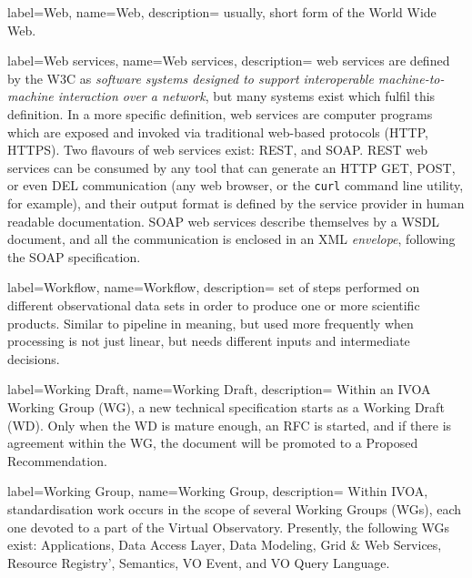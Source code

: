 {
    label={Web},
    name={Web},
    description={
    	usually, short form of the \gls{World Wide Web}.
    }
}

{
    label={Web services},
    name={Web services},
    description={
    	web services are defined by the \gls{W3C} as \emph{software
        systems designed to support interoperable machine-to-machine
        interaction over a network}, but many systems exist which
        fulfil this definition. In a more specific definition, web
        services are computer programs which are exposed and invoked
        via traditional web-based protocols (\gls{HTTP}, \gls{HTTPS}).
        Two flavours of web services exist: \gls{REST}, and \gls{SOAP}.
        REST web services can be consumed by any tool that can generate
        an HTTP GET, POST, or even DEL communication (any web browser,
        or the \texttt{curl} command line utility,
		for example), and their output
        format is defined by the service provider in human readable
        documentation. SOAP web services describe themselves by a
        \gls{WSDL} document, and all the communication is enclosed in
        an \gls{XML} \emph{envelope}, following the SOAP specification.
    }
}

{
    label={Workflow},
    name={Workflow},
    description={
    	set of steps performed on different observational data sets in
        order to produce one or more scientific products. Similar to
        pipeline in meaning, but used more frequently when processing
        is not just linear, but needs different inputs and intermediate
        decisions.
    }
}

{
    label={Working Draft},
    name={Working Draft},
    description={
    	Within an \gls{IVOA} \gls{Working Group} (WG), a new technical
        specification starts as a \gls{Working Draft} (WD). Only when
        the WD is mature enough, an \gls{RFC} is started, and if there
        is agreement within the WG, the document will be promoted to a
        \gls{Proposed Recommendation}.
    }
}

{
    label={Working Group},
    name={Working Group},
    description={
    	Within \gls{IVOA}, standardisation work occurs in the scope of
        several Working Groups (WGs), each one devoted to a part of the
        Virtual Observatory. Presently, the following WGs exist:
        \gls{Applications}, \gls{Data Access Layer}, \gls{Data
        Modeling}, \gls{Grid & Web Services}, \gls{Resource Registry}',
        \gls{Semantics}, \gls{VO Event}, and \gls{VO Query Language}.
    }
}


